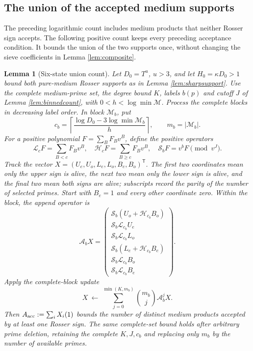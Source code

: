 \documentclass[11pt]{article}
\newtheorem{lemma}[theorem]{Lemma}
\begin{document}
\subsection{The union of the accepted medium supports}\label{sec:acceptedinterval}
The preceding logarithmic count includes medium products that neither
Rosser sign accepts. The following positive count keeps every preceding
acceptance condition. It bounds the union of the two supports once,
without changing the sieve coefficients in Lemma \ref{lem:composite}.

\begin{lemma}[Six-state union count]\label{lem:acceptedcount}
Let $D_0=T^u$, $u>3$, and let $H_0=\kappa D_0>1$ bound both pure-medium
Rosser supports as in Lemma \ref{lem:sharpsupport}. Use the complete
medium-prime set, the degree bound $K$, labels $b(p)$ and cutoff $J$
of Lemma \ref{lem:binnedcount}, with $0<h<\log\min\mathcal M$.
Process the complete blocks in decreasing label order. In block
$\mathcal M_b$, put
\[
c_b=\left\lceil\frac{\log D_0-3\log\min\mathcal M_b}{h}\right\rceil,
\qquad m_b=|\mathcal M_b|.
\]
For a positive polynomial $F=\sum_B F_Bv^B$, define the positive operators
\[
\mathcal L_cF=\sum_{B<c}F_Bv^B,\quad
\mathcal H_cF=\sum_{B\ge c}F_Bv^B,\quad
\mathcal S_bF=v^bF\pmod{v^J}.
\]
Track the vector $X=(U_e,U_o,L_e,L_o,B_e,B_o)^\mathsf T$.
The first two coordinates mean only the upper sign is alive, the next
two mean only the lower sign is alive, and the final two mean both signs
are alive; subscripts record the parity of the number of selected primes.
Start with $B_e=1$ and every other coordinate zero. Within the block,
the append operator is
\begin{equation}\label{eq:acceptedoperator}
\mathcal A_bX=
\begin{pmatrix}
\mathcal S_b(U_o+\mathcal H_{c_b}B_o)\\
\mathcal S_b\mathcal L_{c_b}U_e\\
\mathcal S_b\mathcal L_{c_b}L_o\\
\mathcal S_b(L_e+\mathcal H_{c_b}B_e)\\
\mathcal S_b\mathcal L_{c_b}B_o\\
\mathcal S_b\mathcal L_{c_b}B_e
\end{pmatrix}.
\end{equation}
Apply the complete-block update
\begin{equation}\label{eq:acceptedblock}
X\ \longleftarrow\ \sum_{j=0}^{\min(K,m_b)}
                  \binom{m_b}{j}\mathcal A_b^jX.
\end{equation}
Then $A_{\rm acc}:=\sum_iX_i(1)$ bounds the number of distinct medium
products accepted by at least one Rosser sign. The same complete-set
bound holds after arbitrary prime deletion, retaining the complete
$K,J,c_b$ and replacing only $m_b$ by the number of available primes.
\end{lemma}
\end{document}
